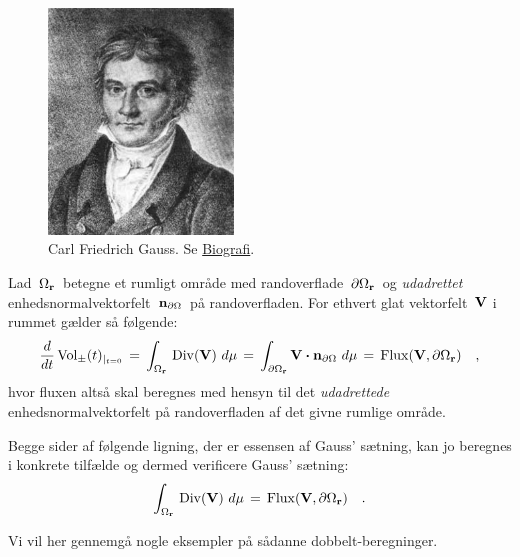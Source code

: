 \begin{figure}[h]
\centerline{\includegraphics[height=60mm]{FIGS/PERSGauss_1828}}
\begin{center}
\caption{\small{Carl Friedrich Gauss.
Se \href{http://www-history.mcs.st-and.ac.uk/Mathematicians/Gauss.html}{Biografi}.}} \label{figGauss}
\end{center}
\end{figure}



\begin{theorem} \label{thmGauss}
Lad $\,\Omega_{\bf{r}}\,$ betegne et rumligt område med
randoverflade $\,\partial \Omega_{\bf{r}}\,$ og \emph{udadrettet}
en\-heds\-nor\-mal\-vektorfelt $\,{\bf{n}}_{\partial \Omega}\,$ på
rand\-over\-fladen. For ethvert glat vektorfelt $\, {\bf{V}}$ i rummet
gælder så følgende:
\begin{equation} \label{eqGauss}
\frac{d}{dt}\operatorname{Vol}_{\pm}(t)_{|_{t=0}}\, = \,
\int_{\Omega_{\bf{r}}} \, \operatorname{Div}({\bf{V}}) \,\,
d\mu \, = \, \int_{\partial \Omega_{\bf{r}}}{\bf
V} \bm{\cdot} {\bf{n}}_{\partial \Omega}\,\,d\mu \, =
\, \operatorname{Flux}({\bf{V}},
\partial \Omega_{\bf{r}}) \quad ,
\end{equation}
hvor fluxen altså skal beregnes med hensyn til det \emph{udadrettede}
enhedsnormalvektorfelt på rand\-over\-fla\-den af det givne rumlige
område.
\end{theorem}

Begge
sider af følgende lig\-ning, der er essensen af
Gauss' sætning, kan jo beregnes i konkrete tilfælde og dermed
verificere Gauss' sætning:
\begin{equation} \label{eqGaussPure}
\int_{\Omega_{\bf{r}}} \, \operatorname{Div}({\bf{V}}) \,\,
d\mu \, = \, \operatorname{Flux}({\bf{V}},
\partial \Omega_{\bf{r}}) \quad .
\end{equation}

Vi vil her gennemgå nogle eksempler på sådanne dobbelt-beregninger.

